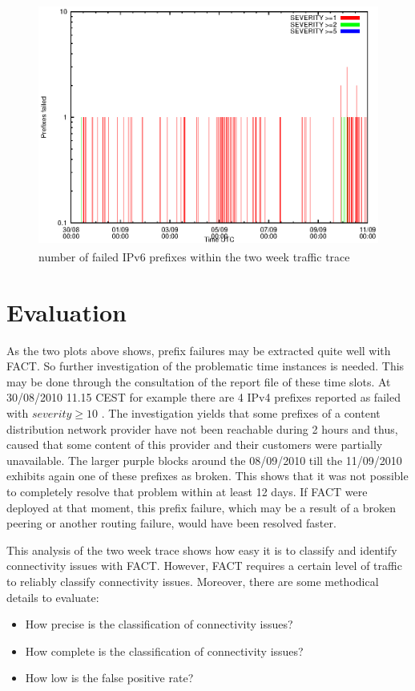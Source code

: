 \begin{figure}[hb!]
	\centering
	\includegraphics[height=80mm]{images/prefix_failed_ipv6.eps}
	\caption{number of failed IPv6 prefixes within the two week traffic trace}
	\label{fig:ipv6_prefix_failed}
\end{figure}

\section{Evaluation}
As the two plots above shows, prefix failures may be extracted quite well with FACT. So further investigation of the problematic time instances is needed. This may be done through the consultation of the report file of these time slots. At 30/08/2010 11.15 CEST for example there are 4 IPv4 prefixes reported as failed with $severity \ge 10$ . The investigation yields that some prefixes of a content distribution network provider have not been reachable during 2 hours and thus, caused that some content of this provider and their customers were partially unavailable. The larger purple blocks around the 08/09/2010 till the 11/09/2010 exhibits again one of these prefixes as broken. This shows that it was not possible to completely resolve that problem within at least 12 days. If FACT were deployed at that moment, this prefix failure, which may be a result of a broken peering or another routing failure, would have been resolved faster.

This analysis of the two week trace shows how easy it is to classify and identify connectivity issues with FACT. However, FACT requires a certain level of traffic to reliably classify connectivity issues. Moreover, there are some methodical details to evaluate:
\begin{itemize}
	\item How precise is the classification of connectivity issues?
	\item How complete is the classification of connectivity issues?
	\item How low is the false positive rate?
\end{itemize}

